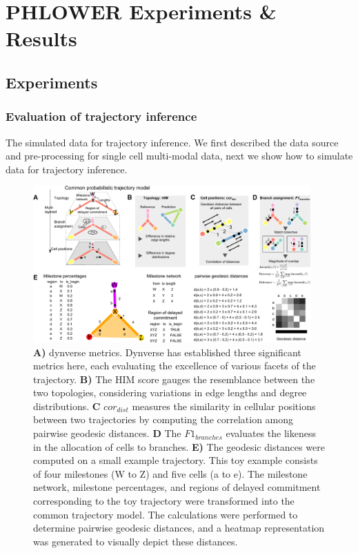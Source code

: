 \chapter{PHLOWER Experiments \& Results}
\label{chapter:PHLOWER_bench}

\graphicspath{{chapter5/figs}}

\section{Experiments}
\subsection{Evaluation of trajectory inference}
The simulated data for trajectory inference. We first described the data source and pre-processing for single cell multi-modal data, next we show how to simulate data for trajectory inference.
\begin{figure}[!ht]
	\centering
	\includegraphics[width=0.95\textwidth]{dynverse_metrics/fig}
	\vspace{0.1cm}
	\caption[Dynverse metrics]{ \textbf{A)} dynverse metrics. Dynverse has established three significant metrics here, each evaluating the excellence of various facets of the trajectory. \textbf{B)} The HIM score gauges the resemblance between the two topologies, considering variations in edge lengths and degree distributions. \textbf{C} $cor_{dist}$ measures the similarity in cellular positions between two trajectories by computing the correlation among pairwise geodesic distances. \textbf{D} The $F1_{branches}$ evaluates the likeness in the allocation of cells to branches. \textbf{E)} The geodesic distances were computed on a small example trajectory. This toy example consists of four milestones (W to Z) and five cells (a to e). The milestone network, milestone percentages, and regions of delayed commitment corresponding to the toy trajectory were transformed into the common trajectory model. The calculations were performed to determine pairwise geodesic distances, and a heatmap representation was generated to visually depict these distances.}
	\label{fig:dynverse_metrics}
\end{figure}

